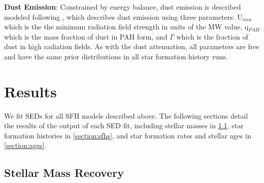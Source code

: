 \documentclass[twocolumn]{aastex62}
\begin{document}
\textbf{Dust Emission}: Constrained by energy balance, dust emission is described modeled following \cite{draine_infrared_2007}, which describes dust emission using three parameters: U$_{min}$ which is the the minimum radiation field strength in units of the MW value, q$_{PAH}$ which is the mass fraction of dust in PAH form, and $\Gamma$ which is the fraction of dust in high radiation fields. As with the dust attenuation, all parameters are free and have the same prior distributions in all star formation history runs. 



\section{Results} 

We fit SEDs for all SFH models described above. The following sections detail the results of the output of each SED fit, including stellar masses in \ref{section:smass}, star formation histories in \ref{section:sfhs}, and star formation rates and stellar ages in \ref{section:ages}. 

\subsection{Stellar Mass Recovery}
\label{section:smass}
\end{document}
